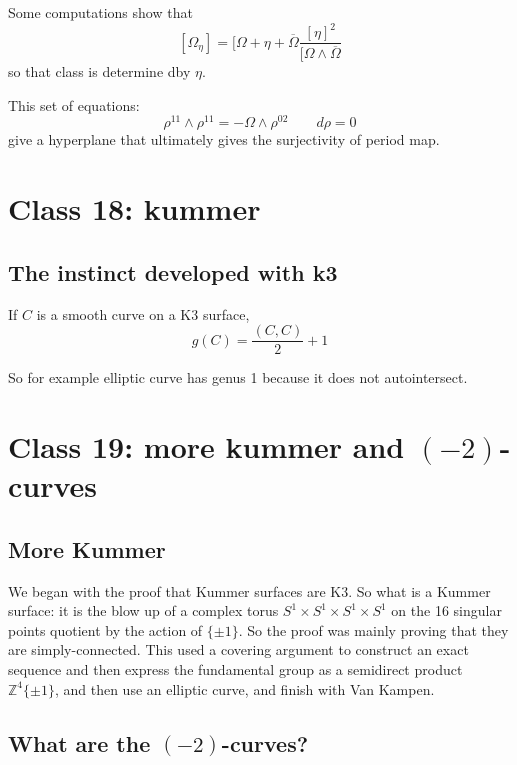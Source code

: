 	\begin{remark}\leavevmode
		Some computations show that
		\[ [\Omega_\eta]=[\Omega+\eta+\overline{\Omega}\frac{[\eta]^2}{[\Omega\wedge \overline{\Omega}}\]
		so that class is determine dby $\eta$.
	\end{remark}

	\begin{remark}\leavevmode
		This set of equations:
		\[\rho^{11}\wedge \rho^{11}=-\Omega\wedge \rho^{02}\qquad d\rho=0\]
		give a hyperplane that ultimately gives the surjectivity of period map.
	\end{remark}

\section{Class 18: kummer}

\subsection{The instinct developed with k3}

\begin{coro}\leavevmode
	If  $C$ is a smooth curve on a K3 surface,
	\[g(C)=\frac{(C,C)}{2}+1\]
\end{coro}

So for example elliptic curve has genus 1 because it does not autointersect. 


\section{Class 19: more kummer and $(-2)$-curves}

\subsection{More Kummer}

We began with the proof that Kummer surfaces are K3. So what is a Kummer surface: it is the blow up of a complex torus $S^1\times S^1\times S^1 \times S^1$ on the 16 singular points quotient by the action of $\{\pm 1\}$. So the proof was mainly proving that they are simply-connected. This used a covering argument to construct an exact sequence and then express the fundamental group as a semidirect product $\mathbb{Z}^4 \{\pm 1\}$, and then use an elliptic curve, and finish with Van Kampen.

\subsection{What are the $(-2)$-curves?}

